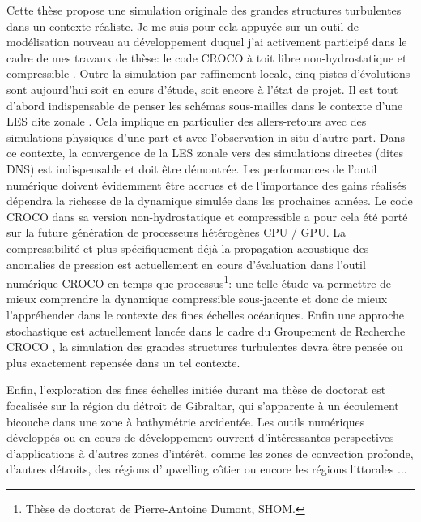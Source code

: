 Cette thèse propose une simulation originale des grandes structures turbulentes dans un contexte réaliste. Je me suis pour cela appuyée sur un outil de modélisation nouveau au développement duquel j'ai activement participé dans le cadre de mes travaux de thèse: le code CROCO à toit libre non-hydrostatique et compressible \citep{hilt_2020}. Outre la simulation par raffinement locale, cinq pistes d'évolutions sont aujourd'hui soit en cours d'étude, soit encore à l'état de projet. Il est tout d'abord indispensable de penser les schémas sous-mailles dans le contexte d'une LES dite zonale \cite{friess_modelisation_2010}. Cela implique en particulier des allers-retours avec des simulations physiques d'une part et avec l'observation in-situ d'autre part. Dans ce contexte, la convergence de la LES zonale vers des simulations directes (dites DNS) est indispensable et doit être démontrée. Les performances de l'outil numérique doivent évidemment être accrues et de l'importance des gains réalisés dépendra la richesse de la dynamique simulée dans les prochaines années. Le code CROCO dans sa version non-hydrostatique et compressible a pour cela été porté sur la future génération de processeurs hétérogènes CPU / GPU. La compressibilité et plus spécifiquement déjà la propagation acoustique des anomalies de pression est actuellement en cours d'évaluation dans l'outil numérique CROCO en temps que processus\footnote{Thèse de doctorat de Pierre-Antoine Dumont, SHOM.}: une telle étude va permettre de mieux comprendre la dynamique compressible sous-jacente et donc de mieux l'appréhender dans le contexte des fines échelles océaniques. Enfin une approche stochastique est actuellement lancée dans le cadre du Groupement de Recherche CROCO \citep{memin_fluid_2014}, la simulation des grandes structures turbulentes devra être pensée ou plus exactement repensée dans un tel contexte.

Enfin, l'exploration des fines échelles initiée durant ma thèse de doctorat est focalisée sur la région du détroit de Gibraltar, qui s'apparente à un écoulement bicouche dans une zone à bathymétrie accidentée. Les outils numériques développés ou en cours de développement ouvrent d'intéressantes perspectives d'applications à d'autres zones d'intérêt, comme les zones de convection profonde, d'autres détroits, des régions d'upwelling côtier ou encore les régions littorales \citep{marchesiello_tridimensional_2021}...



